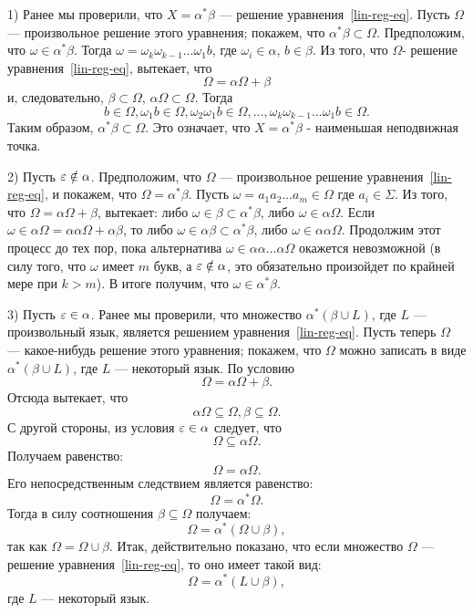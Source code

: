 \begin{myproof}
1) Ранее мы проверили, что $X=\alpha^*\beta$ --- решение уравнения~\eqref{lin-reg-eq}. Пусть $\Omega$ --- произвольное решение этого уравнения; покажем, что $\alpha^*\beta\subset\Omega$. Предположим, что $\omega\in\alpha^*\beta$. Тогда $\omega=\omega_k\omega_{k-1}\ldots\omega_1b$, где $\omega_i\in\alpha$, $b\in\beta$. Из того, что $\Omega$- решение уравнения~\eqref{lin-reg-eq}, вытекает, что
\[
	\Omega = \alpha\Omega + \beta
\]
и, следовательно, $\beta\subset\Omega$, $\alpha\Omega\subset\Omega.$ Тогда
\[
b\in\Omega, \omega_1b\in\Omega, \omega_2\omega_1b\in\Omega, \ldots , \omega_k\omega_{k-1}\ldots\omega_1b\in\Omega.
\]
Таким образом, $\alpha^*\beta\subset\Omega$. Это означает, что $X=\alpha^*\beta$ - наименьшая неподвижная точка.

2)	Пусть $\varepsilon\notin\alpha$. Предположим, что $\Omega$ --- произвольное решение уравнения~\eqref{lin-reg-eq}, и покажем, что $\Omega=\alpha^*\beta$. Пусть $\omega=a_1a_2\ldots a_m\in\Omega$ где $a_i\in\Sigma$. Из того, что $\Omega=\alpha\Omega+\beta$, вытекает: либо $\omega\in\beta\subset\alpha^*\beta$, либо $\omega\in\alpha\Omega$. Если $\omega\in\alpha\Omega=\alpha\alpha\Omega+\alpha\beta$, то либо $\omega\in\alpha\beta\subset\alpha^*\beta$, либо $\omega\in\alpha\alpha\Omega$. Продолжим этот процесс до тех пор, пока альтернатива $\omega\in\alpha\alpha\ldots\alpha\Omega$ окажется невозможной (в силу того, что $\omega$ имеет $m$ букв, а $\varepsilon\notin\alpha$, это обязательно произойдет по крайней мере при $k>m$). В итоге получим, что $\omega\in\alpha^*\beta$.

3) Пусть $\varepsilon\in\alpha$. Ранее мы проверили, что множество $\alpha^*(\beta\cup L)$, где $L$ --- произвольный язык, является решением уравнения~\eqref{lin-reg-eq}. Пусть теперь $\Omega$ --- какое-нибудь решение этого уравнения; покажем, что $\Omega$ можно записать в виде $\alpha^*(\beta\cup L)$, где $L$ --- некоторый язык. По условию
\[
\Omega = \alpha\Omega + \beta.
\]
Отсюда вытекает, что
\[
\alpha\Omega \subseteq \Omega, \beta \subseteq \Omega.
\]
С другой стороны, из условия $\varepsilon\in\alpha$ следует, что
\[
\Omega \subseteq \alpha\Omega.
\]
Получаем равенство:
\[
\Omega = \alpha\Omega.
\]
Его непосредственным следствием является равенство:
\[
\Omega = \alpha^*\Omega.
\]
Тогда в силу соотношения $\beta\subseteq\Omega$ получаем:
\[
\Omega = \alpha^*(\Omega \cup \beta),
\]
так как $\Omega=\Omega\cup\beta$. Итак, действительно показано, что если множество $\Omega$ --- решение уравнения~\eqref{lin-reg-eq}, то оно имеет такой вид:
\[
\Omega = \alpha^*(L \cup \beta),
\]
где $L$ --- некоторый язык.
\end{myproof}

